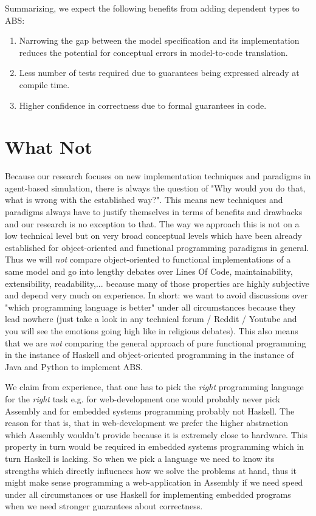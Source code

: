 
Summarizing, we expect the following benefits from adding dependent types to ABS:

\begin{enumerate}
	\item Narrowing the gap between the model specification and its implementation reduces the potential for conceptual errors in model-to-code translation.
	\item Less number of tests required due to guarantees being expressed already at compile time.
	\item Higher confidence in correctness due to formal guarantees in code.
\end{enumerate}

\section{What Not}
\label{sect:what_not}
Because our research focuses on new implementation techniques and paradigms in agent-based simulation, there is always the question of "Why would you do that, what is wrong with the established way?". This means new techniques and paradigms always have to justify themselves in terms of benefits and drawbacks and our research is no exception to that. The way we approach this is not on a low technical level but on very broad conceptual levels which have been already established for object-oriented and functional programming paradigms in general. Thus we will \textit{not} compare object-oriented to functional implementations of a same model and go into lengthy debates over Lines Of Code, maintainability, extensibility, readability,... because many of those properties are highly subjective and depend very much on experience. In short: we want to avoid discussions over "which programming language is better" under all circumstances because they lead nowhere (just take a look in any technical forum / Reddit / Youtube and you will see the emotions going high like in religious debates). This also means that we are \textit{not} comparing the general approach of pure functional programming in the instance of Haskell and object-oriented programming in the instance of Java and Python to implement ABS.

We claim from experience, that one has to pick the \textit{right} programming language for the \textit{right} task e.g. for web-development one would probably never pick Assembly and for embedded systems programming probably not Haskell. The reason for that is, that in web-development we prefer the higher abstraction which Assembly wouldn't provide because it is extremely close to hardware. This property in turn would be required in embedded systems programming which in turn Haskell is lacking. So when we pick a language we need to know its strengths which directly influences how we solve the problems at hand, thus it might make sense programming a web-application in Assembly if we need speed under all circumstances or use Haskell for implementing embedded programs when we need stronger guarantees about correctness.

